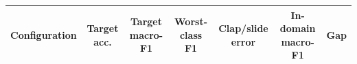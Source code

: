 \begin{tabular}{@{}lcccccc@{}}
\toprule
Configuration & Target acc. & Target macro-F1 & Worst-class F1 & Clap/slide error & In-domain macro-F1 & Gap \\
\midrule
\bottomrule
\end{tabular}
